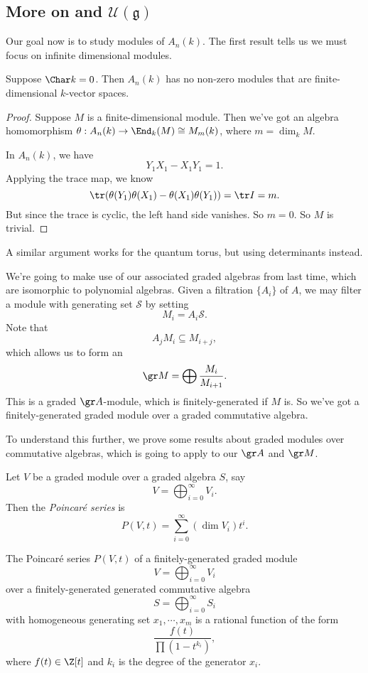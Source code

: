 \documentclass[a4paper]{article}
\begin{document}
\subsection{More on  and \texorpdfstring{$\mathcal{U}(\mathfrak{g})$}{U(g)}}
Our goal now is to study modules of $A_n(k)$. The first result tells us we must focus on infinite dimensional modules.
\begin{lemma}
  Suppose $\Char k = 0$. Then $A_n(k)$ has no non-zero modules that are finite-dimensional $k$-vector spaces.
\end{lemma}

\begin{proof}
  Suppose $M$ is a finite-dimensional module. Then we've got an algebra homomorphism $\theta: A_n(k) \to \End_k(M) \cong M_m(k)$, where $m = \dim_k M$.

  In $A_n(k)$, we have
  \[
    Y_1 X_1 - X_1 Y_1 = 1.
  \]
  Applying the trace map, we know
  \[
    \tr(\theta(Y_1) \theta(X_1) - \theta(X_1) \theta(Y_1)) = \tr I = m.
  \]
  But since the trace is cyclic, the left hand side vanishes. So $m = 0$. So $M$ is trivial.
\end{proof}
A similar argument works for the quantum torus, but using determinants instead.

We're going to make use of our associated graded algebras from last time, which are isomorphic to polynomial algebras. Given a filtration $\{A_i\}$ of $A$, we may filter a module with generating set $\mathcal{S}$ by setting
\[
  M_i = A_i \mathcal{S}.
\]
Note that
\[
  A_j M_i \subseteq M_{i + j},
\]
which allows us to form an 
\[
  \gr M = \bigoplus \frac{M_i}{M_{i + 1}}.
\]
This is a graded $\gr A$-module, which is finitely-generated if $M$ is. So we've got a finitely-generated graded module over a graded commutative algebra.

To understand this further, we prove some results about graded modules over commutative algebras, which is going to apply to our $\gr A$ and $\gr M$.
\begin{defi}
  Let $V$ be a graded module over a graded algebra $S$, say
  \[
    V = \bigoplus_{i = 0}^\infty V_i.
  \]
  Then the \emph{Poincar\'e series} is
  \[
    P(V, t) = \sum_{i = 0}^\infty (\dim V_i) t^i.
  \]
\end{defi}

\begin{thm}
  The Poincar\'e series $P(V, t)$ of a finitely-generated graded module
  \[
    V = \bigoplus_{i = 0}^\infty V_i
  \]
   over a finitely-generated generated commutative algebra
  \[
    S = \bigoplus_{i = 0}^\infty S_i
  \]
  with homogeneous generating set $x_1, \cdots, x_m$ is a rational function of the form
  \[
    \frac{f(t)}{\prod(1 - t^{k_i})},
  \]
  where $f(t) \in \Z[t]$ and $k_i$ is the degree of the generator $x_i$.
\end{thm}
\end{document}
